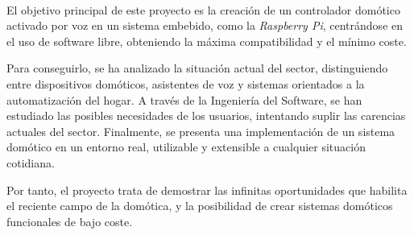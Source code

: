 \chapter*{}
\thispagestyle{empty}
\cleardoublepage

\thispagestyle{empty}



\cleardoublepage
\thispagestyle{empty}

\begin{center}
{\large\bfseries \myTitleES}\\
\end{center}
\begin{center}
\myName\\
\end{center}

\\

\vspace{0.7cm}
\\

El objetivo principal de este proyecto es la creación de un controlador domótico activado por voz en un sistema embebido,
como la \textit{Raspberry Pi}, centrándose en el uso de software libre, obteniendo la máxima compatibilidad y el mínimo
coste.

\bigskip
Para conseguirlo, se ha analizado la situación actual del sector, distinguiendo entre dispositivos domóticos,
asistentes de voz y sistemas orientados a la automatización del hogar. A través de la Ingeniería del Software, se han estudiado
las posibles necesidades de los usuarios, intentando suplir las carencias actuales del sector. Finalmente, se presenta una
implementación de un sistema domótico en un entorno real, utilizable y extensible a cualquier situación cotidiana.

\bigskip
Por tanto, el proyecto trata de demostrar las infinitas oportunidades que habilita el reciente campo de la domótica, y la 
posibilidad de crear sistemas domóticos funcionales de bajo coste.

\cleardoublepage


\thispagestyle{empty}


\begin{center}
{\large\bfseries \myTitle}\\
\end{center}
\begin{center}
\myName\\
\end{center}

